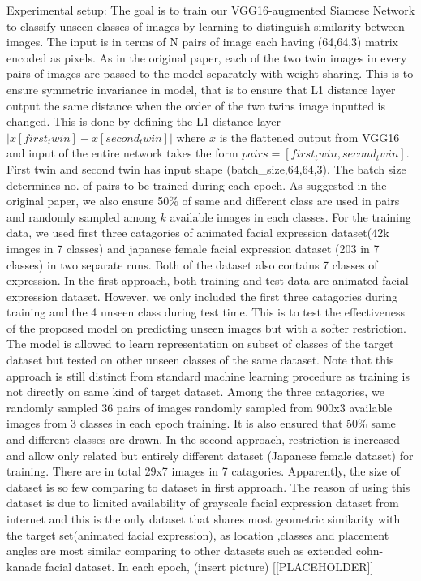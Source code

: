 \documentclass{article}
\begin{document}
Experimental setup: The goal is to train our VGG16-augmented Siamese Network to classify unseen classes of images by learning to
distinguish similarity between images. The input is in terms of N pairs of image each having (64,64,3) matrix encoded as pixels.
As in the original paper, each of the two twin images in every pairs of images are passed to the model separately with weight sharing.
This is to ensure symmetric invariance in model, that is to ensure that L1 distance layer output the same distance when the order of the
two twins image inputted is changed. This is done by defining the L1 distance layer $|x[first_twin] - x[second_twin]|$ where $x$ is the
flattened output from VGG16 and input of the entire network takes the form $pairs=[first_twin,second_twin]$. First twin and second twin 
has input shape (batch_size,64,64,3). The batch size determines no. of pairs to be trained during each epoch. As suggested in the 
original paper, we also ensure 50$\%$ of same and different class are used in pairs and randomly sampled among $k$ available images in 
each classes. For the training data, we used first three catagories of animated facial expression dataset(42k images in 7 classes) and 
japanese female facial expression dataset (203 in 7 classes) in two separate runs. Both of the dataset also contains 7 classes of 
expression. 
In the first approach, both training and test data are animated facial expression 
dataset. However, we only included the first three catagories during training and the 4 unseen class during test time. This is to
test the effectiveness of the proposed model on predicting unseen images but with a softer restriction. The model is allowed to learn 
representation on subset of classes of the target dataset but tested on other unseen classes of the same dataset. Note that this 
approach is still distinct from standard machine learning procedure as training is not directly on same kind of target dataset.
Among the three catagories, we randomly sampled 36 pairs of images randomly sampled from 900x3 available images from 3 classes in 
each epoch training. It is also ensured that 50$\%$ same and different classes are drawn.
In the second approach, restriction is increased and allow only related but entirely different dataset (Japanese female dataset) for 
training. There are in total 29x7 images in 7 catagories. Apparently, the size of dataset is so few comparing to dataset in first
approach. The reason of using this dataset is due to limited availability of grayscale facial expression dataset from internet and this
is the only dataset that shares most geometric similarity with the target set(animated facial expression), as location ,classes and
placement angles are most similar comparing to other datasets such as extended cohn-kanade facial dataset. In each epoch,
(insert picture)
[[PLACEHOLDER]]
\end{document}
